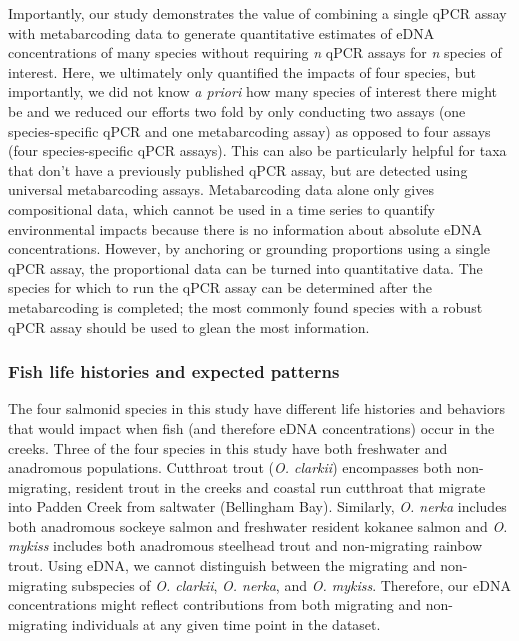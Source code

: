 \documentclass[
]{article}
\begin{document}
Importantly, our study demonstrates the value of combining a single qPCR
assay with metabarcoding data to generate quantitative estimates of eDNA
concentrations of many species without requiring \emph{n} qPCR assays
for \emph{n} species of interest. Here, we ultimately only quantified
the impacts of four species, but importantly, we did not know \emph{a
priori} how many species of interest there might be and we reduced our
efforts two fold by only conducting two assays (one species-specific
qPCR and one metabarcoding assay) as opposed to four assays (four
species-specific qPCR assays). This can also be particularly helpful for
taxa that don't have a previously published qPCR assay, but are detected
using universal metabarcoding assays. Metabarcoding data alone only
gives compositional data, which cannot be used in a time series to
quantify environmental impacts because there is no information about
absolute eDNA concentrations. However, by anchoring or grounding
proportions using a single qPCR assay, the proportional data can be
turned into quantitative data. The species for which to run the qPCR
assay can be determined after the metabarcoding is completed; the most
commonly found species with a robust qPCR assay should be used to glean
the most information.

\hypertarget{fish-life-histories-and-expected-patterns}{%
\subsubsection{Fish life histories and expected
patterns}\label{fish-life-histories-and-expected-patterns}}

The four salmonid species in this study have different life histories
and behaviors that would impact when fish (and therefore eDNA
concentrations) occur in the creeks. Three of the four species in this
study have both freshwater and anadromous populations. Cutthroat trout
(\emph{O. clarkii}) encompasses both non-migrating, resident trout in
the creeks and coastal run cutthroat that migrate into Padden Creek from
saltwater (Bellingham Bay). Similarly, \emph{O. nerka} includes both
anadromous sockeye salmon and freshwater resident kokanee salmon and
\emph{O. mykiss} includes both anadromous steelhead trout and
non-migrating rainbow trout. Using eDNA, we cannot distinguish between
the migrating and non-migrating subspecies of \emph{O. clarkii},
\emph{O. nerka}, and \emph{O. mykiss}. Therefore, our eDNA
concentrations might reflect contributions from both migrating and
non-migrating individuals at any given time point in the dataset.
\end{document}
